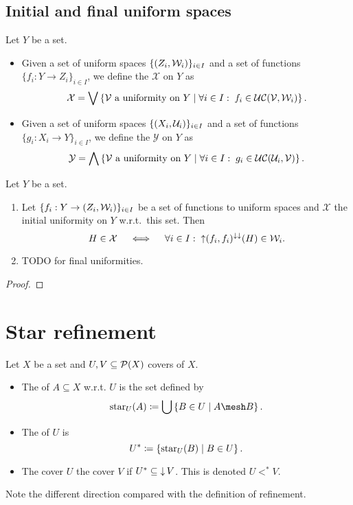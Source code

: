 \subsection{Initial and final uniform spaces}
\begin{definition}
Let $Y$ be a set.
\begin{itemize}
\item Given a set of uniform spaces $\{\left( Z_i, \mathcal{W}_i \right)\}_{i\in I}$ and a set of functions $\{f_i: Y\to Z_i\}_{i\in I}$, we define the  $\mathcal{X}$ on $Y$ as
\[ \mathcal{X} = \bigvee \left\{ \text{$\mathcal{V}$ a uniformity on $Y$} \;\middle|\; \forall i\in I:\; f_i\in \operatorname{\mathcal{UC}}(\mathcal{V}, \mathcal{W}_i) \right\}. \]
\item Given a set of uniform spaces $\{\left( X_i, \mathcal{U}_i \right)\}_{i\in I}$ and a set of functions $\{g_i: X_i\to Y\}_{i\in I}$, we define the  $\mathcal{Y}$ on $Y$ as
\[ \mathcal{Y} = \bigwedge \left\{ \text{$\mathcal{V}$ a uniformity on $Y$} \;\middle|\; \forall i\in I:\; g_i\in \operatorname{\mathcal{UC}}(\mathcal{U}_i, \mathcal{V}) \right\}. \]
\end{itemize}
\end{definition}

\begin{proposition}
Let $Y$ be a set.
\begin{enumerate}
\item Let $\{f_i: Y\to \left( Z_i, \mathcal{W}_i \right)\}_{i\in I}$ be a set of functions to uniform spaces and $\mathcal{X}$ the initial uniformity on $Y$ w.r.t.\ this set. Then
\[ H\in \mathcal{X} \quad\iff\quad \forall i\in I: \; \operatorname{\uparrow}(f_i,f_i)^{\downarrow\downarrow}(H)\in \mathcal{W}_i. \]
\item TODO for final uniformities.
\end{enumerate}
\end{proposition}
\begin{proof}

\end{proof}

\section{Star refinement}
\begin{definition}
Let $X$ be a set and $U,V\subseteq \operatorname{\mathcal{P}}(X)$ covers of $X$.
\begin{itemize}
\item The  of $A\subseteq X$ w.r.t. $U$ is the set defined by
\[ \operatorname{star}_U(A) \defeq \bigcup\setbuilder{B\in U}{A\mesh B}. \]
\item The  of $U$ is
\[ U^* \coloneqq \left\{ \operatorname{star}_U(B) \;\middle|\; B\in U \right\}. \]
\item The cover $U$  the cover $V$ if $U^*\subseteq \operatorname{\downarrow} V$. This is denoted $U <^* V$.
\end{itemize}
\end{definition}
Note the different direction compared with the definition of refinement.


